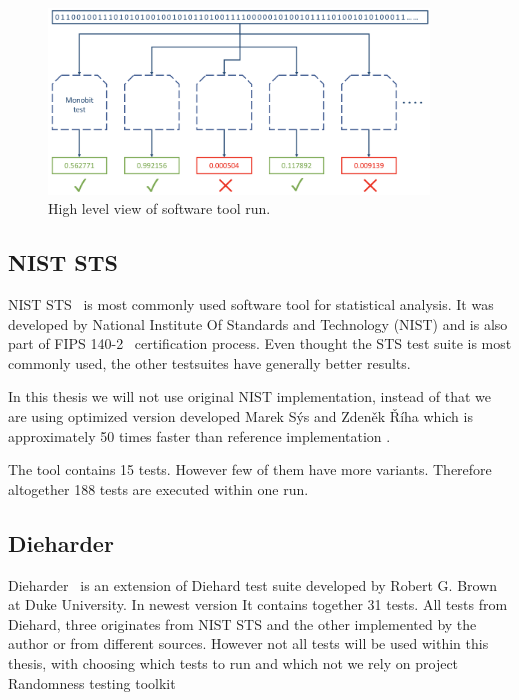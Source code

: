 \documentclass[
    digital,    %
    oneside,    %
    color,
    11pt,
    nocover,
    notable,
    nolof,
    nolot,
    final
]{fithesis3}
\begin{document}
\begin{figure}[h]
	\centering
	\includegraphics[width=0.9\textwidth]{./images/pictures/software-tool.png}
	\caption{High level view of software tool run.}
	\label{fig:whole-suite}
\end{figure}

\subsection{NIST STS}
{NIST STS}~\cite{nist-sts} is most commonly used software tool for statistical analysis. It was developed by National Institute Of Standards and Technology (NIST) and is also part of FIPS 140-2~\cite{nist-fips-140-2} certification process. Even thought the STS test suite is most commonly used, the other testsuites have generally better results.

In this thesis we will not use original NIST implementation, instead of that we are using optimized version developed Marek Sýs and Zdeněk Říha which is approximately 50 times faster than reference implementation \cite{Sys:2016:A9O:2988516.2988228}. 

The tool contains 15 tests. However few of them have more variants. Therefore altogether 188 tests are executed within one run.

\subsection{Dieharder}

Dieharder~\cite{dieharder} is an extension of Diehard test suite \cite{diehard} developed by Robert G. Brown at Duke University. In newest version It contains together 31 tests. All tests from Diehard, three originates from NIST STS and the other implemented by the author or from different sources. However not all tests will be used within this thesis, with choosing which tests to run and which not we rely on project Randomness testing toolkit~\cite{Obratil2017thesis}
\end{document}
